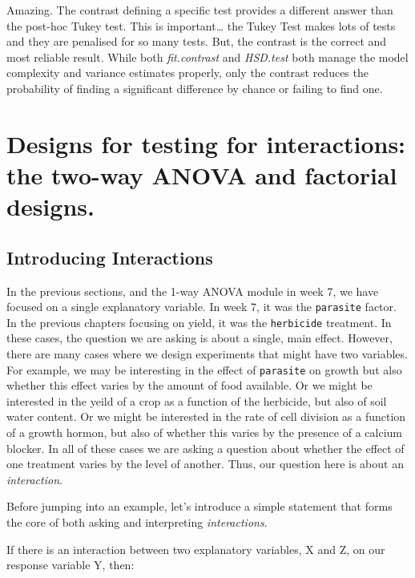 \documentclass[
]{book}
\begin{document}
Amazing. The contrast defining a specific test provides a different answer than the post-hoc Tukey test. This is important\ldots{} the Tukey Test makes lots of tests and they are penalised for so many tests. But, the contrast is the correct and most reliable result. While both \emph{fit.contrast} and \emph{HSD.test} both manage the model complexity and variance estimates properly, only the contrast reduces the probability of finding a significant difference by chance or failing to find one.

\hypertarget{designs-for-testing-for-interactions-the-two-way-anova-and-factorial-designs.}{%
\chapter{Designs for testing for interactions: the two-way ANOVA and factorial designs.}\label{designs-for-testing-for-interactions-the-two-way-anova-and-factorial-designs.}}

\hypertarget{introducing-interactions}{%
\section{Introducing Interactions}\label{introducing-interactions}}

In the previous sections, and the 1-way ANOVA module in week 7, we have focused on a single explanatory variable. In week 7, it was the \texttt{parasite} factor. In the previous chapters focusing on yield, it was the \texttt{herbicide} treatment. In these cases, the question we are asking is about a single, main effect. However, there are many cases where we design experiments that might have two variables. For example, we may be interesting in the effect of \texttt{parasite} on growth but also whether this effect varies by the amount of food available. Or we might be interested in the yeild of a crop as a function of the herbicide, but also of soil water content. Or we might be interested in the rate of cell division as a function of a growth hormon, but also of whether this varies by the presence of a calcium blocker. In all of these cases we are asking a question about whether the effect of one treatment varies by the level of another. Thus, our question here is about an \emph{interaction}.

Before jumping into an example, let's introduce a simple statement that forms the core of both asking and interpreting \emph{interactions}.

If there is an interaction between two explanatory variables, X and Z, on our response variable Y, then:
\end{document}
